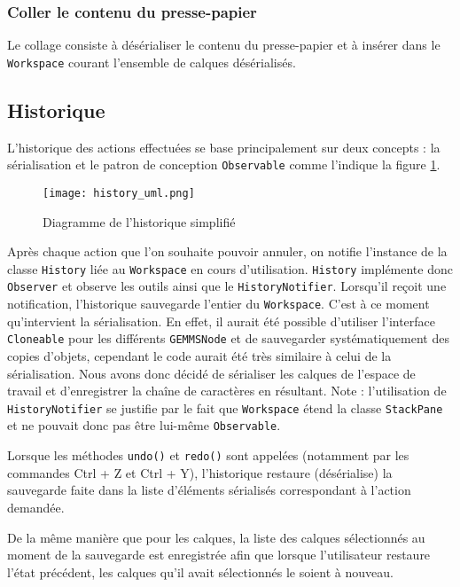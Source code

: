 \subsubsection{Coller le contenu du presse-papier}
Le collage consiste à désérialiser le contenu du presse-papier et à insérer dans le \texttt{Workspace} courant  l'ensemble de calques désérialisés.

\subsection{Historique}
L'historique des actions effectuées se base principalement sur deux concepts : la sérialisation et le patron de conception \texttt{Observable} comme l'indique la figure \ref{fig:hist_uml}.

\begin{figure}[!ht]
    \caption{Diagramme de l'historique simplifié}
    \centering
    \texttt{[image: history\_uml.png]}
    \label{fig:hist_uml}
\end{figure}

Après chaque action que l'on souhaite pouvoir annuler, on notifie l'instance de la classe \texttt{History} liée au \texttt{Workspace} en cours d'utilisation. \texttt{History} implémente donc \texttt{Observer} et observe les outils ainsi que le \texttt{HistoryNotifier}. Lorsqu'il reçoit une notification, l'historique sauvegarde l'entier du \texttt{Workspace}. C'est à ce moment qu'intervient la sérialisation. En effet, il aurait été possible d'utiliser l'interface \texttt{Cloneable} pour les différents \texttt{GEMMSNode} et de sauvegarder systématiquement des copies d'objets, cependant le code aurait été très similaire à celui de la sérialisation. Nous avons donc décidé de sérialiser les calques de l'espace de travail et d'enregistrer la chaîne de caractères en résultant. Note : l'utilisation de \texttt{HistoryNotifier} se justifie par le fait que \texttt{Workspace} étend la classe \texttt{StackPane} et ne pouvait donc pas être lui-même \texttt{Observable}.

Lorsque les méthodes \texttt{undo()} et \texttt{redo()} sont appelées (notamment par les commandes Ctrl + Z et Ctrl + Y), l'historique restaure (désérialise) la sauvegarde faite dans la liste d'éléments sérialisés correspondant à l'action demandée.

De la même manière que pour les calques, la liste des calques sélectionnés au moment de la sauvegarde est enregistrée afin que lorsque l'utilisateur restaure l'état précédent, les calques qu'il avait sélectionnés le soient à nouveau.

